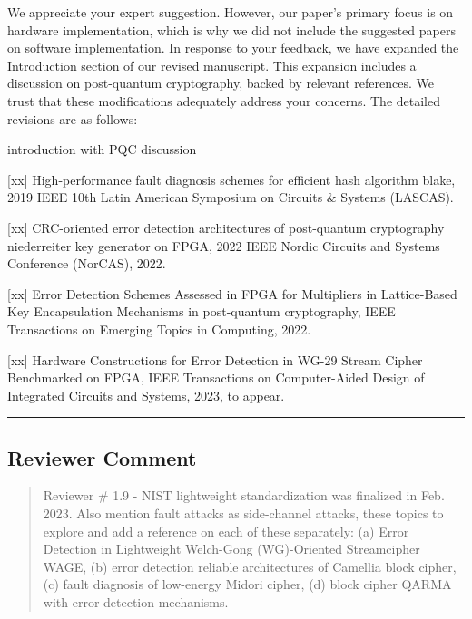 We appreciate your expert suggestion. However, our paper's primary focus is on hardware implementation, which is why we did not include the suggested papers on software implementation. In response to your feedback, we have expanded the Introduction section of our revised manuscript. This expansion includes a discussion on post-quantum cryptography, backed by relevant references. We trust that these modifications adequately address your concerns. The detailed revisions are as follows:

\color{blue}

introduction with PQC discussion


	[xx] High-performance fault diagnosis schemes for efficient hash algorithm blake, 2019 IEEE 10th Latin American Symposium on Circuits \& Systems (LASCAS).

	[xx] CRC-oriented error detection architectures of post-quantum cryptography niederreiter key generator on FPGA, 2022 IEEE Nordic Circuits and Systems Conference (NorCAS), 2022.

	[xx] Error Detection Schemes Assessed in FPGA for Multipliers in Lattice-Based Key Encapsulation Mechanisms in post-quantum cryptography, IEEE Transactions on Emerging Topics in Computing, 2022.

	[xx] Hardware Constructions for Error Detection in WG-29 Stream Cipher Benchmarked on FPGA, IEEE Transactions on Computer-Aided Design of Integrated Circuits and Systems, 2023, to appear.

\color{black}

\noindent\rule{\linewidth}{2.0pt}

\subsection{Reviewer Comment}
\begin{mdframed}
	\begin{quote}
		Reviewer \# 1.9 - NIST lightweight standardization was finalized in Feb. 2023. Also mention fault attacks as side-channel attacks, these topics to explore and add a reference on each of these separately: (a) Error Detection in Lightweight Welch-Gong (WG)-Oriented Streamcipher WAGE, (b) error detection reliable architectures of Camellia block cipher, (c) fault diagnosis of low-energy Midori cipher, (d) block cipher QARMA with error detection mechanisms.
	\end{quote}
\end{mdframed}

